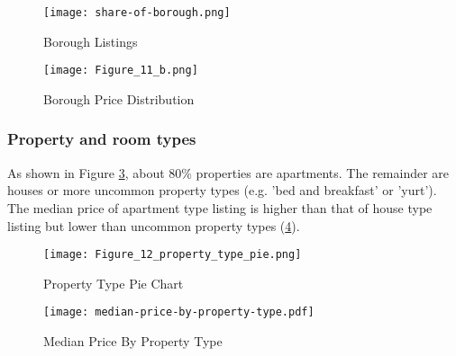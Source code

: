 \begin{figure}[H] \centering
  \texttt{[image: share-of-borough.png]}
    \caption{Borough Listings}
    \label{fig:borough-number-of-listing}
\end{figure}





\begin{figure}[H]\centering
    \texttt{[image: Figure\_11\_b.png]}
    \caption{Borough Price Distribution}
    \label{fig:borough-price-distribution}
\end{figure}

\subsubsection*{Property and room types}

As shown in Figure \ref{fig:property_type},
about 80\% properties are apartments. The remainder are houses or more uncommon
property types (e.g. 'bed and breakfast' or 'yurt'). The median price of
apartment type listing is higher than that of house type listing but lower than
uncommon property types (\ref{fig:property_type_price}).

\begin{figure}[H]
    \centering
        \centering
        \caption{Property Type Pie Chart}
        \texttt{[image: Figure\_12\_property\_type\_pie.png]}
      \label{fig:property_type}
\end{figure}

\begin{figure}[H]
        \centering
        \texttt{[image: median-price-by-property-type.pdf]}
        \caption{Median Price By Property Type}
        \label{fig:property_type_price}
\end{figure}

